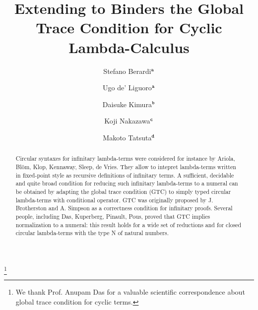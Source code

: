 \documentclass[twoside,11pt]{entics}
\begin{document}
\begin{frontmatter}
  \title{Extending to Binders the Global Trace Condition for Cyclic Lambda-Calculus} 
 \thanks[ALL]{We thank Prof. Anupam Das for a valuable scientific correspondence about 
 global trace condition for cyclic terms.}   %
  \author{Stefano Berardi$^{\tt a}$}	%
   \author{Ugo de' Liguoro$^{\tt a}$}		%
    \author{Daisuke Kimura$^{\tt b}$}
      \author{Koji Nakazawa$^{\tt c}$}
       \author{Makoto Tatsuta$^{\tt d}$}
   \address[a]{Computer Science Department, Turin University, Torino, Italy}  							
   \address[b]{Department of Information Science, Toho University, Japan} 
   \address[c]{Graduate School of Informatics, Nagoya University, Japan}
   \address[d]{National Institute of Informatics/Sokendai, Tokyo, Japan}
 
 
   
\begin{abstract} 
Circular syntaxes for infinitary lambda-terms
were considered for instance by Ariola, Bl\"{o}m, Klop, Kennaway, Sleep, de Vries.
They allow to intepret lambda-terms written in fixed-point style 
as recursive definitions of infinitary terms. 
A sufficient, decidable and quite broad condition for reducing such 
infinitary lambda-terms to a numeral can be obtained
by adapting the global trace condition (GTC) to simply typed 
circular lambda-terms with conditional operator. 
GTC was originally proposed by J. Brotherston and A. Simpson
as a correctness condition for infinitary proofs.
Several people, including Das, Kuperberg, Pinault, Pous,
proved that GTC implies normalization to a numeral:
this result holds for a wide set of reductions and for closed circular lambda-terms 
with the type N of natural numbers. 


\end{abstract}
\end{frontmatter}
\end{document}
